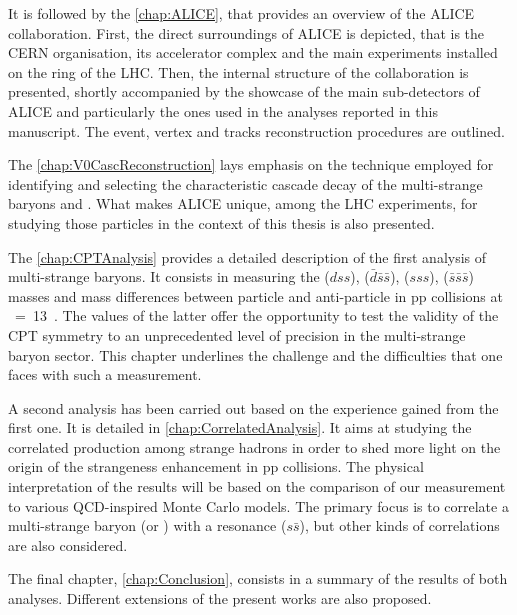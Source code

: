 It is followed by the \chap\ref{chap:ALICE}, that provides an overview of the ALICE collaboration. First, the direct surroundings of ALICE is depicted, that is the CERN organisation, its accelerator complex and the main experiments installed on the ring of the LHC. Then, the internal structure of the collaboration is presented, shortly accompanied by the showcase of the main sub-detectors of ALICE and particularly the ones used in the analyses reported in this manuscript. The event, vertex and tracks reconstruction procedures are outlined.

The \chap\ref{chap:V0CascReconstruction} lays emphasis on the technique employed for identifying and selecting the characteristic cascade decay of the multi-strange baryons \rmXi and \rmOmega. What makes ALICE unique, among the LHC experiments, for studying those particles in the context of this thesis is also presented.

The \chap\ref{chap:CPTAnalysis} provides a detailed description of the first analysis of multi-strange baryons. It consists in measuring the \rmXiM($dss$), \rmAxiP($\bar{d}\bar{s}\bar{s}$), \rmOmegaM($sss$), \rmAomegaP($\bar{s}\bar{s}\bar{s}$)  masses and mass differences between particle and anti-particle in pp collisions at \sqrtS~=~13~\tev. The values of the latter offer the opportunity to test the validity of the CPT symmetry to an unprecedented level of precision in the multi-strange baryon sector. This chapter underlines the challenge and the difficulties that one faces with such a measurement.

A second analysis has been carried out based on the experience gained from the first one. It is detailed in \chap\ref{chap:CorrelatedAnalysis}. It aims at studying the correlated production among strange hadrons in order to shed more light on the origin of the strangeness enhancement in pp collisions. The physical interpretation of the results will be based on the comparison of our measurement to various QCD-inspired Monte Carlo models. The primary focus is to correlate a multi-strange baryon (\rmXi or \rmOmega) with a \rmPhiMes resonance ($s\bar{s}$), but other kinds of correlations are also considered.


The final chapter, \chap\ref{chap:Conclusion}, consists in a summary of the results of both analyses. Different extensions of the present works are also proposed.
